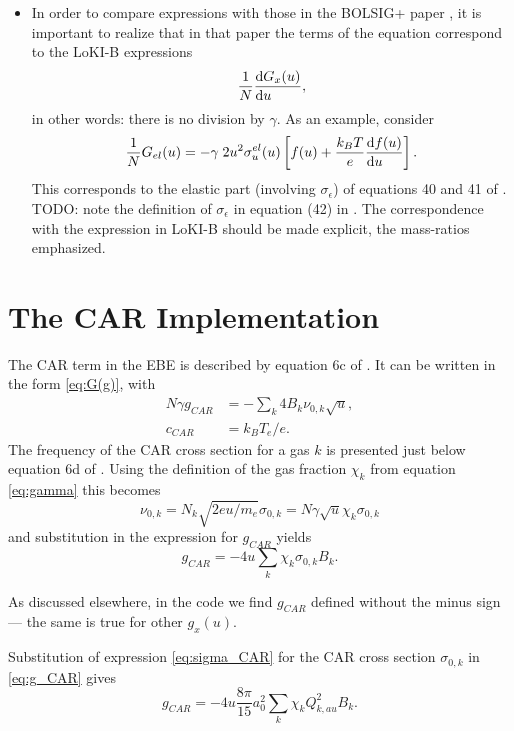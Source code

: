\documentclass{book}
\begin{document}
\begin{itemize}
        elastic terms on the power balance, see \cite[eq. 24c]{Tejero2019},
        \cite[eq. 38c]{Manual_1_0_0} and section \ref{sec:old-power-terms} of the
	present text\footnote{
          In the code, a different expression is used, that appears to be
          based on partial integration of the expressions in the paper and
          manual. See section \ref{sec:old-power-terms}.}
        When the meaning of $g_x(u)$ is changed, also those expressions must
        be updated accordingly.
  \item In order to compare expressions with those in the BOLSIG+ paper
        \cite{Hagelaar2005}, it is important to realize that in that paper the
        terms of the equation correspond to the LoKI-B expressions
        \[
          \frac{1}{N}\DERIV{G_x(u)}{u},
        \]
        in other words: there is no division by $\gamma$. As an example, consider
        \[
          \frac{1}{N}G_{el}(u)
          = -\gamma\;2u^2\sigma^{el}_u(u)\left[f(u) + \frac{k_BT}{e}\DERIV{f(u)}{u}\right].
        \]
        This corresponds to the elastic part (involving $\sigma_\epsilon$) of equations
        40 and 41 of \cite{Hagelaar2005}.
        TODO: note the definition of $\sigma_\epsilon$ in equation (42) in
        \cite{Hagelaar2005}. The correspondence with the expression in LoKI-B should
        be made explicit, the mass-ratios emphasized.
\end{itemize}

\section{The CAR Implementation}

The CAR term in the EBE is described by equation 6c of \cite{Tejero2019}.
It can be written in the form \eqref{eq:G(g)}, with
\begin{align}
  N\gamma g_{CAR} &= -\sum\limits_k 4B_k\nu_{0,k}\sqrt{u}, \\
  c_{CAR} &= k_BT_e/e.
\end{align}
The frequency of the CAR cross section for a gas $k$ is presented just below
equation 6d of \cite{Tejero2019}. Using the definition of the gas fraction
$\chi_k$ from equation \eqref{eq:gamma} this becomes
\begin{equation}
  \nu_{0,k} = N_k\sqrt{2eu/m_e}\sigma_{0,k} = N\gamma\sqrt{u}\chi_k\sigma_{0,k}
\end{equation}
and substitution in the expression for $g_{CAR}$ yields
\begin{equation}
  g_{CAR} = -4u\sum\limits_k \chi_k\sigma_{0,k}B_k.
  \label{eq:g_CAR}
\end{equation}
\begin{framed}
  As discussed elsewhere, in the code we find $g_{CAR}$ defined without
  the minus sign --- the same is true for other $g_x(u)$.
\end{framed}
Substitution of expression \eqref{eq:sigma_CAR} for the CAR cross section
$\sigma_{0,k}$ in \eqref{eq:g_CAR} gives
\begin{equation}
  g_{CAR} = -4u\frac{8\pi}{15}a_0^2\sum\limits_k \chi_k Q_{k,au}^2B_k.
\end{equation}
\end{document}
